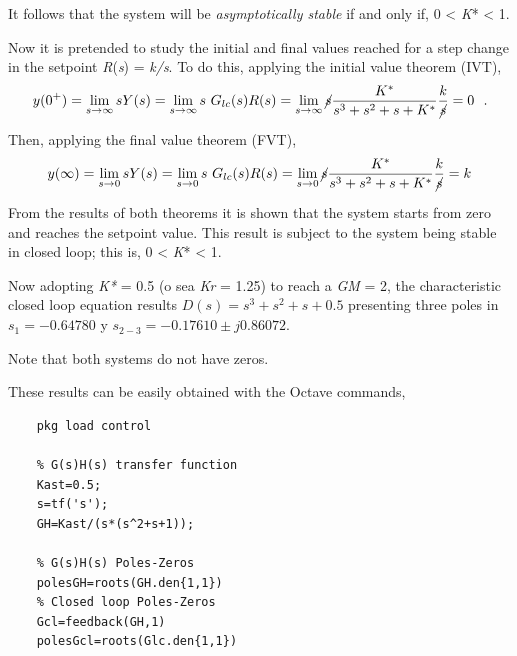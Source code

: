 It follows that the system will be \textit{asymptotically stable} if and only if, 0 < \textit{K}* < 1.

\vspace{0.4cm}
Now it is pretended to study the initial and final values reached for a step change in the setpoint \textit{R}(\textit{s}) = \textit{k/s}. To do this, applying the initial value theorem (IVT),
\begin{equation*} 
	y(0^+)= \lim _{s \to \infty} s Y(s) = \lim _{s \to \infty} s \ G_{lc}(s)R(s) =  \lim _{s \to \infty} \cancel{s} \frac{K^*}{s^3+s^2+s+K^*} \frac{k}{\cancel{s}} = 0 ~~\mbox{.}
\end{equation*}

Then, applying the final value theorem (FVT),
\begin{equation*} 
	y(\infty)= \lim _{s \to 0} s Y(s) = \lim _{s \to 0} s \ G_{lc}(s)R(s) = \lim _{s \to 0} \cancel{s} \frac{K^*}{s^3+s^2+s+K^*} \frac{k}{\cancel{s}} =  k
\end{equation*}

From the results of both theorems it is shown that the system starts from zero and reaches the setpoint value. This result is subject to the system being stable in closed loop; this is, 0 < \textit{K}* < 1.

\vspace{0.4cm}
Now adopting \textit{K*} = 0.5 (o sea \textit{Kr} = 1.25) to reach a \textit{GM} = 2, the characteristic closed loop equation results $D(s)=s^3+s^2+s+0.5$ presenting three poles in $s_1= -0.64780$ y $s_{2-3}=-0.17610 \pm j 0.86072$.

Note that both systems do not have zeros.

\vspace{0.4cm}
These results can be easily obtained with the Octave commands,
%

\begin{verbatim}
    pkg load control
    
	% G(s)H(s) transfer function
	Kast=0.5;
	s=tf('s');
	GH=Kast/(s*(s^2+s+1));
	
	% G(s)H(s) Poles-Zeros
	polesGH=roots(GH.den{1,1})
	% Closed loop Poles-Zeros
	Gcl=feedback(GH,1)
	polesGcl=roots(Glc.den{1,1})
\end{verbatim}

